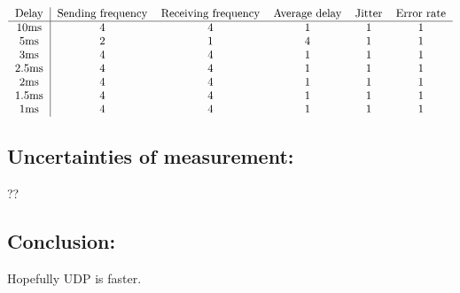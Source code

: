 \begin{center}
	$\begin{tabular}{c|ccccc}
		Delay & \text{Sending frequency} & \text{Receiving frequency} & \text{Average delay} & Jitter & \text{Error rate}\\
		\hline
		10ms & 4 & 4 & 1 & 1 & 1 \\
		5ms & 2 & 1 & 4 & 1 & 1 \\
		3ms & 4 & 4 & 1 & 1 & 1 \\
		2.5ms & 4 & 4 & 1 & 1 & 1 \\
		2ms & 4 & 4 & 1 & 1 & 1 \\
		1.5ms & 4 & 4 & 1 & 1 & 1 \\
		1ms & 4 & 4 & 1 & 1 & 1 \\
	\end{tabular}$
\end{center}


\subsection*{Uncertainties of measurement:}

??

\subsection*{Conclusion:}

Hopefully UDP is faster.